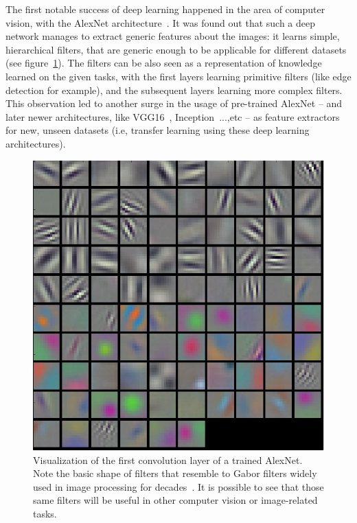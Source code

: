   \par The first notable success of deep learning happened in the area of computer vision, with the AlexNet architecture~\citep{krizhevsky2012imagenet}. It was found out that such a deep network manages to extract generic features about the images: it learns simple, hierarchical filters, that are generic enough to be applicable for different datasets (see figure~\ref{fig:AlexNet_filters}). The filters can be also seen as a representation of knowledge learned on the given tasks, with the first layers learning primitive filters (like edge detection for example), and the subsequent layers learning more complex filters. This observation led to another surge in the usage of pre-trained AlexNet -- and later newer architectures, like VGG16~\citep{simonyan2014very}, Inception~\citep{szegedy2015going}...,etc -- as feature extractors for new, unseen datasets (i.e, transfer learning using these deep learning architectures).

  \begin{figure}[!htbp]
    \centering
    \includegraphics[scale=0.4]{images/sota/filt1.jpeg}
    \caption[Convolution Neural Networks filters shape]{Visualization of the first convolution layer of a trained AlexNet. Note the basic shape of filters that resemble to Gabor filters widely used in image processing for decades~\citep{fogel1989gabor,jain1991unsupervised}. It is possible to see that those same filters will be useful in other computer vision or image-related tasks.}
    \label{fig:AlexNet_filters}
  \end{figure}

